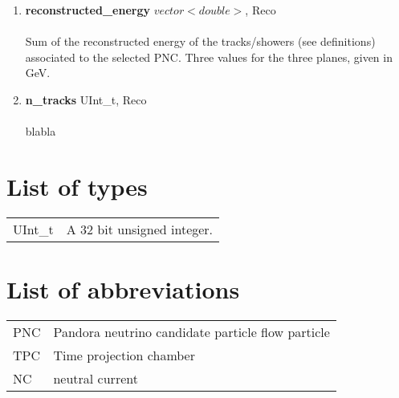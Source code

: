 \documentclass{article}
\begin{document}
\begin{enumerate}
\item \textbf{reconstructed\_energy } \hfill $vector<double>$, Reco \\ \\ 
Sum of the reconstructed energy of the tracks/showers (see definitions) associated to the selected PNC. Three values for the three planes, given in GeV.
\vspace{5mm}

\item \textbf{n\_tracks}  \hfill UInt\_t, Reco \\ \\ 
blabla
\vspace{5mm}


\end{enumerate}
\clearpage
\setcounter{secnumdepth}{1}
\appendix
\section{List of types}

\vspace{3mm}
\begin{tabular}{ll}
UInt\_t & A 32 bit unsigned integer. \\

\end{tabular}
\vspace{3mm}

\section{List of abbreviations}
\vspace{3mm}
\begin{tabular}{ll}
PNC & Pandora neutrino candidate particle flow particle \\
TPC & Time projection chamber \\
NC  & neutral current 

\end{tabular}
\vspace{3mm}
\end{document}
